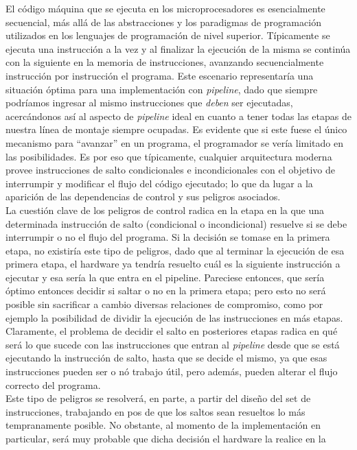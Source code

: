 El código máquina que se ejecuta en los microprocesadores es esencialmente 
secuencial, más allá de las abstracciones y los paradigmas de programación 
utilizados en los lenguajes de programación de nivel superior. Típicamente se 
ejecuta una instrucción a la vez y al finalizar la ejecución de la misma se 
continúa con la siguiente en la memoria de instrucciones, avanzando 
secuencialmente instrucción por instrucción el programa. Este escenario 
representaría una situación óptima para una implementación con \emph{pipeline}, 
dado que siempre podríamos ingresar al mismo instrucciones que \emph{deben} ser 
ejecutadas, acercándonos así al aspecto de \emph{pipeline} ideal en cuanto a 
tener todas las etapas de nuestra línea de montaje siempre ocupadas. Es 
evidente que si este fuese el único mecanismo para ``avanzar'' en un programa, 
el programador se vería limitado en las posibilidades. Es por eso que 
típicamente, cualquier arquitectura moderna provee instrucciones de salto 
condicionales e incondicionales con el objetivo de interrumpir y modificar el 
flujo del código ejecutado; lo que da lugar a la aparición de las dependencias 
de control y sus peligros asociados.\\
La cuestión clave de los peligros de control radica en la etapa en la que una 
determinada instrucción de salto (condicional o incondicional) resuelve si se 
debe interrumpir o no el flujo del programa. Si la decisión se tomase en la 
primera etapa, no existiría este tipo de peligros, dado que al terminar la 
ejecución de esa primera etapa, el hardware ya tendría resuelto cuál es la 
siguiente instrucción a ejecutar y esa sería la que entra en el pipeline. 
Pareciese entonces, que sería óptimo entonces decidir si saltar o no en la 
primera etapa; pero esto no será posible sin sacrificar a cambio diversas 
relaciones de compromiso, como por ejemplo la posibilidad de dividir la 
ejecución de las instrucciones en más etapas. Claramente, el problema de 
decidir el salto en posteriores etapas radica en qué será lo que sucede con 
las instrucciones que entran al \emph{pipeline} desde que se está ejecutando la 
instrucción de salto, hasta que se decide el mismo, ya que esas instrucciones 
pueden ser o nó trabajo útil, pero además, pueden alterar el flujo correcto del 
programa.\\
Este tipo de peligros se resolverá, en parte, a partir del diseño del set de 
instrucciones, trabajando en pos de que los saltos sean resueltos lo más 
tempranamente posible. No obstante, al momento de la implementación en 
particular, será muy probable que dicha decisión el hardware la realice en la 
